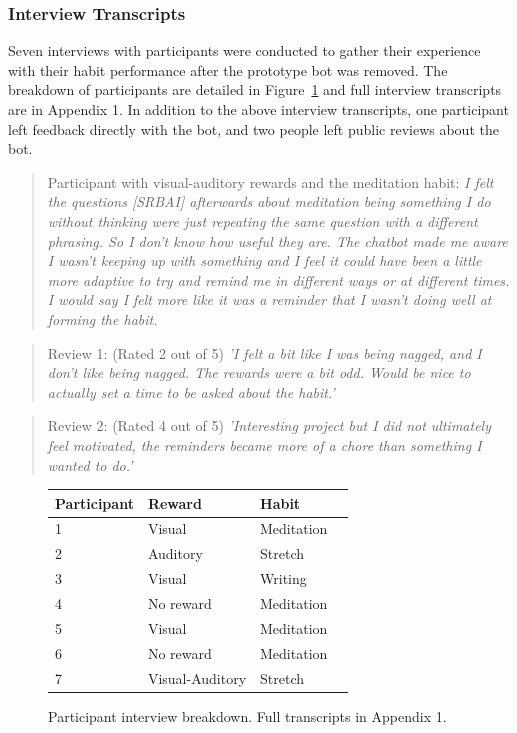 \subsubsection*{Interview Transcripts}
Seven interviews with participants were conducted to gather their experience with their habit performance after the prototype bot was removed. The breakdown of participants are detailed in Figure~\ref{fig:interview_details} and full interview transcripts are in Appendix 1. In addition to the above interview transcripts, one participant left feedback directly with the bot, and two people left public reviews about the bot.

\begin{quote}
Participant with visual-auditory rewards and the meditation habit: \textit{I felt the questions [SRBAI] afterwards about meditation being something I do without thinking were just repeating the same question with a different phrasing. So I don't know how useful they are. The chatbot made me aware I wasn't keeping up with something and I feel it could have been a little more adaptive to try and remind me in different ways or at different times. I would say I felt more like it was a reminder that I wasn't doing well at forming the habit.}
\end{quote}
\begin{quote}
Review 1: (Rated 2 out of 5) \textit{'I felt a bit like I was being nagged, and I don't like being nagged. The rewards were a bit odd. Would be nice to actually set a time to be asked about the habit.'}
\end{quote}
\begin{quote}
Review 2: (Rated 4 out of 5) \textit{'Interesting project but I did not ultimately feel motivated, the reminders became more of a chore than something I wanted to do.'}
\end{quote}

\begin{figure}[H] %
\begin{center}
\begin{tabular}{ |p{3cm}|p{2.8cm}|p{3cm}|p{2cm}| }
 \hline
 \textbf{Participant} & \textbf{Reward} & \textbf{Habit} \\ \hline
 1 & Visual & Meditation \\ \hline
 2 & Auditory & Stretch \\ \hline
 3 & Visual & Writing \\ \hline
 4 & No reward & Meditation \\ \hline
 5 & Visual & Meditation \\ \hline
 6 & No reward & Meditation \\ \hline
 7 & Visual-Auditory & Stretch \\ \hline
\end{tabular}
\end{center}
    \caption{Participant interview breakdown. Full transcripts in Appendix 1.}
    \label{fig:interview_details}

\end{figure}


